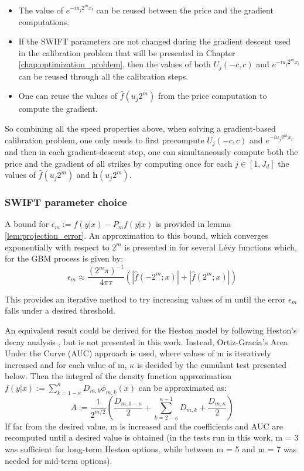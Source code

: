 \documentclass[12,twoside]{mammeTFM}
\theoremstyle{definition}
\theoremstyle{remark}
\begin{document}
\begin{itemize}
\item The value of $e^{-i u_j 2^m x_l}$ can be reused between the price and the gradient computations.
\item If the SWIFT parameters are not changed during the gradient descent used in the calibration problem that will be presented in Chapter \ref{chap:optimization_problem}, then the values of both $U_j(-c,c)$ and $e^{-i u_j 2^m x_l}$ can be reused through all the calibration steps.
\item One can reuse the values of $\hat{f}(u_j 2^m)$ from the price computation to compute the gradient. 
\end{itemize}
So combining all the speed properties above, when solving a gradient-based calibration problem, one only needs to first precompute $U_j(-c,c)$ and $e^{-i u_j 2^m x_l}$ and then in each gradient-descent step, one can simultaneously compute both the price and the gradient of all strikes by computing once for each $j \in [1, J_d]$ the values of $\hat{f}(u_j 2^m)$ and $\boldsymbol{h}(u_j 2^m)$.

\subsubsection{SWIFT parameter choice} \label{subsec:approximation_error}

A bound for $\epsilon_m := f(y|x) - P_mf(y|x)$ is provided in lemma \ref{lem:projection_error}. An approximation to this bound, which converges exponentially with respect to $2^m$ is presented in \cite{mar17} for several L\'evy functions which, for the GBM process is given by:
\begin{equation}
\epsilon_m \approx \dfrac{(2^m \pi)^{-1}}{4 \pi \tau}\left( \left| \hat{f}(-2^m;x) \right| + \left| \hat{f}(2^m;x)\right| \right)
\end{equation}

This provides an iterative method to try increasing values of m until the error $\epsilon_m$ falls under a desired threshold.

An equivalent result could be derived for the Heston model by following Heston's decay analysis \cite{hes93}, but is not presented in this work. Instead, Ortiz-Gracia's Area Under the Curve (AUC) \cite{Ortiz-Gracia2016} approach is used, where values of m is iteratively increased and for each value of m, $\kappa$ is decided by the cumulant test presented below. Then the integral of the density function approximation $f(y|x) := \sum_{k = 1 - \kappa}^{\kappa} D_{m,k}\phi_{m,k}(x)$ can be approximated as:
\begin{equation}
A := \dfrac{1}{2^{m/2}}\left( \dfrac{D_{m, 1 - \kappa}}{2} + \sum_{k = 2 - \kappa}^{\kappa - 1} D_{m, k} + \dfrac{D_{m, \kappa}}{2} \right)
\end{equation}
If far from the desired value, m is increased and the coefficients and AUC are recomputed until a desired value is obtained (in the tests run in this work, m = 3 was sufficient for long-term Heston options, while between m = 5 and m = 7 was needed for mid-term options).
\end{document}
